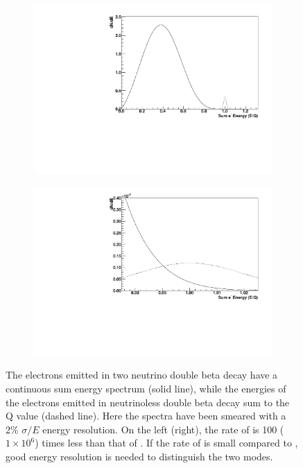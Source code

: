 \documentclass[herrin-thesis.tex]{subfiles}
\begin{document}
\begin{figure}[htb]
         \begin{subfigure}[b]{0.48\textwidth}
		\centering
		\includegraphics[width=\textwidth]{./plots/nu_comp_2nu_0nu_1e2.pdf}
	\end{subfigure}\hfill%
         \begin{subfigure}[b]{0.48\textwidth}
		\centering
		\includegraphics[width=\textwidth]{./plots/nu_comp_2nu_0nu_1e6.pdf}
	\end{subfigure}
	\caption[Comparison of \twonu{} and \zeronu{} energy spectra]{The electrons emitted in two neutrino double beta decay have a continuous sum energy spectrum (solid line), while the energies of the electrons emitted in neutrinoless double beta decay sum to the Q value (dashed line). Here the spectra have been smeared with a 2\% \(\sigma/E\) energy resolution. On the left (right), the rate of \zeronu{} is 100 (\(1\times10^{6}\)) times less than that of \twonu{}. If the rate of \zeronu{} is small compared to \twonu{}, good energy resolution is needed to distinguish the two modes.}
	\label{fig:nu_comp_2nu_0nu}
\end{figure}
\end{document}
